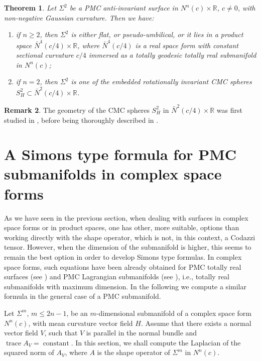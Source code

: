 \documentclass[11pt]{amsart}
\theoremstyle{plain}
\newtheorem{theorem}                {Theorem}      [section]
\theoremstyle{definition}
\newtheorem{remark}       [theorem]  {Remark}
\DeclareMathOperator{\trace}{trace} \DeclareMathOperator{\di}{div}
\DeclareMathOperator{\cst}{constant}
\numberwithin{equation}{section}
\begin{document}
\begin{theorem}\label{thm_surfaces}
Let $\Sigma^2$ be a PMC anti-invariant surface in $N^n(c)\times\mathbb{R}$, $c\neq 0$, with non-negative Gaussian curvature. Then we have:
\begin{enumerate}

\item if $n\geq 2$, then $\Sigma^2$ is either flat, or pseudo-umbilical, or it lies in a product space $\bar N^4(c/4)\times\mathbb{R}$, where $\bar N^4(c/4)$ is a real space form with constant sectional curvature $c/4$ immersed as a totally geodesic totally real submanifold in $N^n(c)$;

\item if $n=2$, then $\Sigma^2$ is one of the embedded rotationally invariant CMC spheres $S_H^2\subset\bar N^2(c/4)\times\mathbb{R}$. 


\end{enumerate}
\end{theorem}

\begin{remark} The geometry of the CMC spheres $S_H^2$ in $\bar N^2(c/4)\times\mathbb{R}$ was first studied in \cite{H-H,P-R}, before being thoroughly described in \cite{AR,AR2}.
\end{remark}

\section{A Simons type formula for PMC submanifolds in complex space forms}

As we have seen in the previous section, when dealing with surfaces in complex space forms or in product spaces, one has other, more suitable, options than working directly with the shape operator, which is not, in this context, a Codazzi tensor. However, when the dimension of the submanifold is higher, this seems to remain the best option in order to develop Simons type formulas. In complex space forms, such equations have been already obtained for PMC totally real surfaces (see \cite{Chen74}) and PMC Lagrangian submanifolds (see \cite{Chen77}), i.e., totally real submanifolds with maximum dimension. In the following we compute a similar formula in the general case of a PMC submanifold.

Let $\Sigma^m$, $m\leq 2n-1$, be an $m$-dimensional submanifold of a complex space form $N^n(c)$, with mean curvature vector field $H$. Assume that there exists a normal vector field $V$, such that $V$ is parallel in the normal bundle and $\trace A_V=\cst$. In this section, we shall compute the Laplacian of the squared norm of $A_V$, where $A$ is the shape operator of $\Sigma^m$ in $N^n(c)$.
\end{document}
